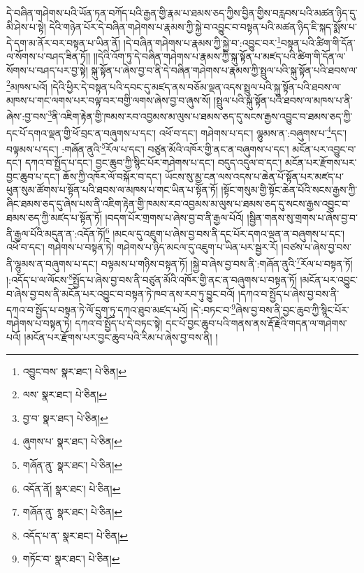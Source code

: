 དེ་བཞིན་གཤེགས་པའི་ཡོན་ཏན་བཀོད་པའི་རྒྱན་གྱི་རྣམ་པ་ཐམས་ཅད་ཀྱིས་བྱིན་གྱིས་བརླབས་པའི་མཚན་ཉིད་དུ་མི་ཤེས་པ་སྟེ། དེའི་གཉེན་པོར་དེ་བཞིན་གཤེགས་པ་རྣམས་ཀྱི་སྐྱེ་བ་འབྱུང་བ་བསྟན་པའི་མཚན་ཉིད་ཇི་སྐད་སྨོས་པ་དེ་དག་མ་ནོར་བར་བསྟན་པ་ཡིན་ནོ། །དེ་བཞིན་གཤེགས་པ་རྣམས་ཀྱི་སྐྱེ་བ་:འབྱུང་བར་\footnote{འབྱུང་བས་  སྣར་ཐང་།  པེ་ཅིན། }བསྟན་པའི་ཚིག་གི་དོན་ལ་སོགས་པ་བཤད་ཟིན་ཏོ།། །།དེའི་འོག་ཏུ་དེ་བཞིན་གཤེགས་པ་རྣམས་ཀྱི་སྐུ་སྟོན་པ་མཛད་པའི་ཚིག་གི་དོན་ལ་སོགས་པ་བཤད་པར་བྱ་སྟེ། སྐུ་སྟོན་པ་ཞེས་བྱ་བ་ནི་དེ་བཞིན་གཤེགས་པ་རྣམས་ཀྱི་སྤྲུལ་པའི་སྐུ་སྟོན་པའི་ཐབས་ལ་\footnote{ལས་  སྣར་ཐང་།  པེ་ཅིན། }མཁས་པའོ། །དེའི་ཕྱིར་དེ་བསྟན་པའི་དབང་དུ་མཛད་ནས་བཅོམ་ལྡན་འདས་སྤྲུལ་པའི་སྐུ་སྟོན་པའི་ཐབས་ལ་མཁས་པ་གང་ལགས་པར་བལྟ་བར་བགྱི་ལགས་ཞེས་བྱ་བ་ཞུས་སོ། །སྤྲུལ་པའི་སྐུ་སྟོན་པའི་ཐབས་ལ་མཁས་པ་ནི་ཞེས་:བྱ་བས་\footnote{བྱ་བ་  སྣར་ཐང་།  པེ་ཅིན། }ནི་འཇིག་རྟེན་གྱི་ཁམས་རབ་འབྱམས་མ་ལུས་པ་ཐམས་ཅད་དུ་སངས་རྒྱས་འབྱུང་བ་ཐམས་ཅད་ཀྱི་དང་པོ་དགའ་ལྡན་གྱི་ཕོ་བྲང་ན་བཞུགས་པ་དང་། འཕོ་བ་དང་། གཤེགས་པ་དང་། ལྷུམས་ན་:བཞུགས་པ་\footnote{ཞུགས་པ་  སྣར་ཐང་།  པེ་ཅིན། }དང་། བལྟམས་པ་དང་། :གཞོན་ནུའི་\footnote{གཞོན་ནུ་  སྣར་ཐང་།  པེ་ཅིན། }རོལ་པ་དང་། བཙུན་མོའི་འཁོར་གྱི་ནང་ན་བཞུགས་པ་དང་། མངོན་པར་འབྱུང་བ་དང་། དཀའ་བ་སྤྱོད་པ་དང་། བྱང་ཆུབ་ཀྱི་སྙིང་པོར་གཤེགས་པ་དང་། བདུད་འདུལ་བ་དང་། མངོན་པར་རྫོགས་པར་བྱང་ཆུབ་པ་དང་། ཆོས་ཀྱི་འཁོར་ལོ་བསྐོར་བ་དང་། ཡོངས་སུ་མྱ་ངན་ལས་འདས་པ་ཆེན་པོ་སྟོན་པར་མཛད་པ་ཕུན་སུམ་ཚོགས་པ་སྟོན་པའི་ཐབས་ལ་མཁས་པ་གང་ཡིན་པ་སྟོན་ཏོ། །སྟོང་གསུམ་གྱི་སྟོང་ཆེན་པོའི་སངས་རྒྱས་ཀྱི་ཞིང་ཐམས་ཅད་དུ་ཞེས་པས་ནི་འཇིག་རྟེན་གྱི་ཁམས་རབ་འབྱམས་མ་ལུས་པ་ཐམས་ཅད་དུ་སངས་རྒྱས་འབྱུང་བ་ཐམས་ཅད་ཀྱི་མཛད་པ་སྟོན་ཏོ། །བདག་པོར་གྲགས་པ་ཞེས་བྱ་བ་ནི་རྒྱལ་པོའོ། །སྦྱིན་གནས་སུ་གྲགས་པ་ཞེས་བྱ་བ་ནི་རྒྱལ་པོའི་མདུན་ན་:འདོན་ཏོ།\footnote{འདོན་ནོ།  སྣར་ཐང་།  པེ་ཅིན། } །མངལ་དུ་འཇུག་པ་ཞེས་བྱ་བས་ནི་དང་པོར་དགའ་ལྡན་ན་བཞུགས་པ་དང་། འཕོ་བ་དང་། གཤེགས་པ་བསྟན་ཏེ། གཤེགས་པ་ཉིད་མངལ་དུ་འཇུག་པ་ཡིན་པར་སྦྱར་རོ། །བཙས་པ་ཞེས་བྱ་བས་ནི་ལྷུམས་ན་བཞུགས་པ་དང་། བལྟམས་པ་གཉིས་བསྟན་ཏོ། །སྐྱེ་བ་ཞེས་བྱ་བས་ནི་:གཞོན་ནུའི་\footnote{གཞོན་ནུ་  སྣར་ཐང་།  པེ་ཅིན། }རོལ་པ་བསྟན་ཏོ། །:འདོད་པ་ལ་ལོངས་\footnote{འདོད་པ་ན་  སྣར་ཐང་།  པེ་ཅིན། }སྤྱོད་པ་ཞེས་བྱ་བས་ནི་བཙུན་མོའི་འཁོར་གྱི་ནང་ན་བཞུགས་པ་བསྟན་ཏོ། །མངོན་པར་འབྱུང་བ་ཞེས་བྱ་བས་ནི་མངོན་པར་འབྱུང་བ་བསྟན་ཏེ་ཁབ་ནས་རབ་ཏུ་བྱུང་བའོ། །དཀའ་བ་སྤྱོད་པ་ཞེས་བྱ་བས་ནི་དཀའ་བ་སྤྱོད་པ་བསྟན་ཏེ་ལོ་དྲུག་ཏུ་དཀའ་ཐུབ་མཛད་པའོ། །དེ་:བཏང་བ་\footnote{གཏོང་བ་  སྣར་ཐང་།  པེ་ཅིན། }ཞེས་བྱ་བས་ནི་བྱང་ཆུབ་ཀྱི་སྙིང་པོར་གཤེགས་པ་བསྟན་ཏེ། དཀའ་བ་སྤྱོད་པ་དེ་བཏང་སྟེ། དང་པོ་བྱང་ཆུབ་པའི་གནས་ནས་རྡོ་རྗེའི་གདན་ལ་གཤེགས་པའོ། །མངོན་པར་རྫོགས་པར་བྱང་ཆུབ་པའི་རིམ་པ་ཞེས་བྱ་བས་ནི། །
